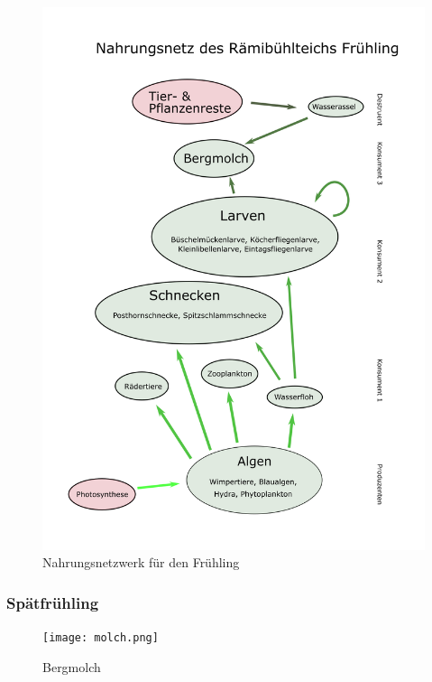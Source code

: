 \documentclass{article}
\begin{document}
            \begin{figure}[H]
            \centering
            \includegraphics[scale=0.75]{NewNetz1.png}
            \caption{Nahrungsnetzwerk für den Frühling}
            \label{fig:universe}
            \end{figure}
            
            \newpage
        
        \subsubsection{Spätfrühling}
        
            \begin{figure}[h!]
            \centering
            \texttt{[image: molch.png]}
            \caption{Bergmolch}
            \label{fig:universe}
            \end{figure}
            
\end{document}
